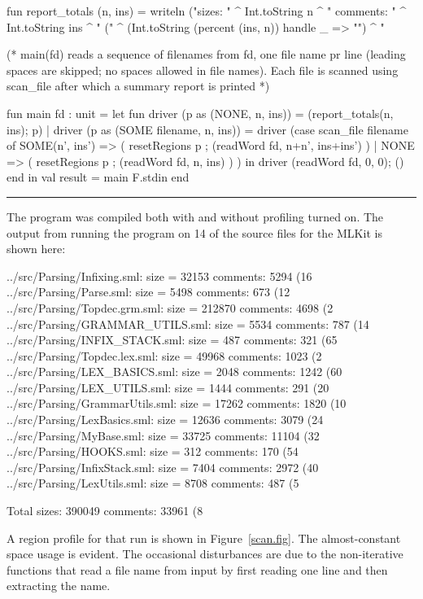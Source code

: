 \documentclass[12pt]{book}
\begin{document}
\begin{smlcode}
  fun report_totals (n, ins) =
      writeln ("\nTotal sizes: " ^ Int.toString n
               ^ " comments: " ^ Int.toString ins
               ^ " (" ^ (Int.toString (percent (ins, n))
                         handle _ => "") ^ "%

  (* main(fd) reads a sequence of filenames from fd, one file
     name pr line (leading spaces are skipped; no spaces
     allowed in file names). Each file is scanned using
     scan_file after which a summary report is printed *)

  fun main fd : unit =
      let fun driver (p as (NONE, n, ins)) =
              (report_totals(n, ins); p)
            | driver (p as (SOME filename, n, ins)) =
              driver (case scan_file filename of
                          SOME(n', ins') =>
                          ( resetRegions p
                          ; (readWord fd, n+n', ins+ins')
                          )
                        | NONE => ( resetRegions p
                                  ; (readWord fd, n, ins)
                                  )
                     )
      in driver (readWord fd, 0, 0); ()
      end
in
  val result = main F.stdin
end
\end{smlcode}
\hrule
\bigskip

The program was compiled both with and without profiling turned on.  The output
from running the program on 14 of the source files for the MLKit is shown here:
\begin{scriptcode}
../src/Parsing/Infixing.sml: size = 32153 comments: 5294 (16%
../src/Parsing/Parse.sml: size = 5498 comments: 673 (12%
../src/Parsing/Topdec.grm.sml: size = 212870 comments: 4698 (2%
../src/Parsing/GRAMMAR_UTILS.sml: size = 5534 comments: 787 (14%
../src/Parsing/INFIX_STACK.sml: size = 487 comments: 321 (65%
../src/Parsing/Topdec.lex.sml: size = 49968 comments: 1023 (2%
../src/Parsing/LEX_BASICS.sml: size = 2048 comments: 1242 (60%
../src/Parsing/LEX_UTILS.sml: size = 1444 comments: 291 (20%
../src/Parsing/GrammarUtils.sml: size = 17262 comments: 1820 (10%
../src/Parsing/LexBasics.sml: size = 12636 comments: 3079 (24%
../src/Parsing/MyBase.sml: size = 33725 comments: 11104 (32%
../src/Parsing/HOOKS.sml: size = 312 comments: 170 (54%
../src/Parsing/InfixStack.sml: size = 7404 comments: 2972 (40%
../src/Parsing/LexUtils.sml: size = 8708 comments: 487 (5%

Total sizes: 390049 comments: 33961 (8%
\end{scriptcode}
A region profile for that run is shown in Figure~\ref{scan.fig}.  The
almost-constant space usage is evident. The occasional disturbances are due to
the non-iterative functions that read a file name from input by first reading
one line and then extracting the name.
\end{document}
